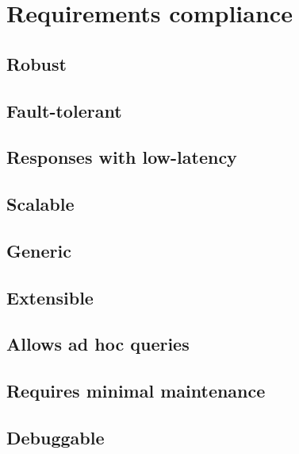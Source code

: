 \section{Requirements compliance}

\subsection{Robust}
\subsection{Fault-tolerant}
\subsection{Responses with low-latency}
\subsection{Scalable}
\subsection{Generic}
\subsection{Extensible}
\subsection{Allows ad hoc queries}
\subsection{Requires minimal maintenance}
\subsection{Debuggable}